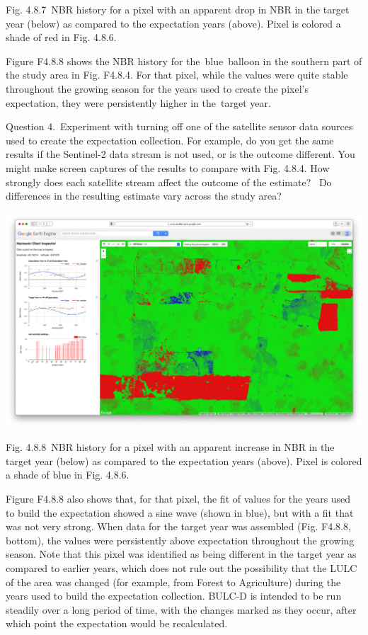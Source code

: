 \documentclass[
  letterpaper,
  DIV=11,
  numbers=noendperiod]{scrreprt}
\begin{document}
Fig. 4.8.7~NBR history for a pixel with an apparent drop in NBR in the
target year (below) as compared to the expectation years (above). Pixel
is colored a shade of red in Fig. 4.8.6.

Figure F4.8.8 shows the NBR history for the~blue~balloon in the southern
part of the study area in Fig. F4.8.4. For that pixel, while the values
were quite stable throughout the growing season for the years used to
create the pixel's expectation, they were persistently higher in
the~target year.~

Question 4.~Experiment with turning off one of the satellite sensor data
sources used to create the expectation collection. For example, do you
get the same results if the Sentinel-2 data stream is not used, or is
the outcome different. You might make screen captures of the results to
compare with Fig. 4.8.4. How strongly does each satellite stream affect
the outcome of the estimate? ~Do differences in the resulting estimate
vary across the study area?

\includegraphics{./F4/image52.png}

Fig. 4.8.8~NBR history for a pixel with an apparent increase in NBR in
the target year (below) as compared to the expectation years (above).
Pixel is colored a shade of blue in Fig. 4.8.6.

Figure F4.8.8 also shows that, for that pixel, the fit of values for the
years used to build the expectation showed a sine wave (shown in blue),
but with a fit that was not very strong. When data for the target year
was assembled (Fig. F4.8.8, bottom), the values were persistently above
expectation throughout the growing season. Note that this pixel was
identified as being different in the target year as compared to earlier
years, which does not rule out the possibility that the LULC of the area
was changed (for example, from Forest to Agriculture) during the years
used to build the expectation collection. BULC-D is intended to be run
steadily over a long period of time, with the changes marked as they
occur, after which point the expectation would be recalculated.
\end{document}
